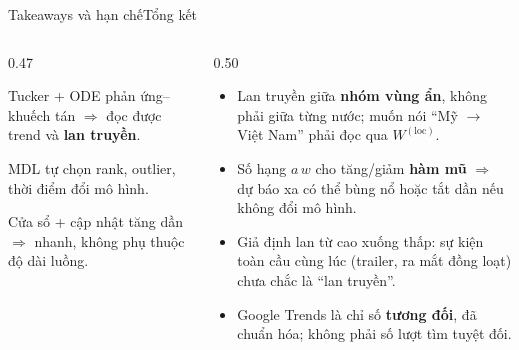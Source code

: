 \begin{frame}{Takeaways và hạn chế}{Tổng kết}
\begin{columns}[T,onlytextwidth]
\begin{column}{0.47\textwidth}
  \par\vspace{1mm}
  \begin{takeaway}[Interpretable]
    \small Tucker + ODE phản ứng--khuếch tán $\Rightarrow$ đọc được trend và \textbf{lan truyền}.
  \end{takeaway}\par\vspace{1.5mm}
  \begin{takeaway}[Automatic]
    \small MDL tự chọn rank, outlier, thời điểm đổi mô hình.
  \end{takeaway}\par\vspace{1.5mm}
  \begin{takeaway}[Scalable]
    \small Cửa sổ + cập nhật tăng dần $\Rightarrow$ nhanh, không phụ thuộc độ dài luồng.
  \end{takeaway}
\end{column}
\begin{column}{0.50\textwidth}
  \par\vspace{1mm}
  \small
  \begin{itemize}
    \item Lan truyền giữa \textbf{nhóm vùng ẩn}, không phải giữa từng nước; muốn nói ``Mỹ $\rightarrow$ Việt Nam'' phải đọc qua $W^{(\mathrm{loc})}$.
    \item Số hạng $a\,w$ cho tăng/giảm \textbf{hàm mũ} $\Rightarrow$ dự báo xa có thể bùng nổ hoặc tắt dần nếu không đổi mô hình.
    \item Giả định lan từ cao xuống thấp: sự kiện toàn cầu cùng lúc (trailer, ra mắt đồng loạt) chưa chắc là ``lan truyền''.
    \item Google Trends là chỉ số \textbf{tương đối}, đã chuẩn hóa; không phải số lượt tìm tuyệt đối.
  \end{itemize}
\end{column}
\end{columns}
\vfill
{}
\end{frame}
